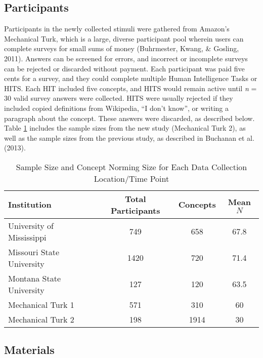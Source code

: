 \documentclass[english,man]{apa6}
\theoremstyle{definition}
\theoremstyle{definition}
\theoremstyle{definition}
\theoremstyle{remark}
\begin{document}
\subsection{Participants}\label{participants}

Participants in the newly collected stimuli were gathered from Amazon's
Mechanical Turk, which is a large, diverse participant pool wherein
users can complete surveys for small sums of money (Buhrmester, Kwang,
\& Gosling, 2011). Answers can be screened for errors, and incorrect or
incomplete surveys can be rejected or discarded without payment. Each
participant was paid five cents for a survey, and they could complete
multiple Human Intelligence Tasks or HITS. Each HIT included five
concepts, and HITS would remain active until \emph{n} = 30 valid survey
answers were collected. HITS were usually rejected if they included
copied definitions from Wikipedia, \enquote{I don't know}, or writing a
paragraph about the concept. These answers were discarded, as described
below. Table \ref{tab:part-table} includes the sample sizes from the new
study (Mechanical Turk 2), as well as the sample sizes from the previous
study, as described in Buchanan et al. (2013).

\begin{table}[tbp]
\begin{center}
\begin{threeparttable}
\caption{\label{tab:part-table}Sample Size and Concept Norming Size for Each Data Collection Location/Time Point}
\begin{tabular}{lccc}
\toprule
Institution & Total Participants & Concepts & Mean $N$\\
\midrule
University of Mississippi & 749 & 658 & 67.8\\
Missouri State University & 1420 & 720 & 71.4\\
Montana State University & 127 & 120 & 63.5\\
Mechanical Turk 1 & 571 & 310 & 60\\
Mechanical Turk 2 & 198 & 1914 & 30\\
\bottomrule
\end{tabular}
\end{threeparttable}
\end{center}
\end{table}

\subsection{Materials}\label{materials}
\end{document}
